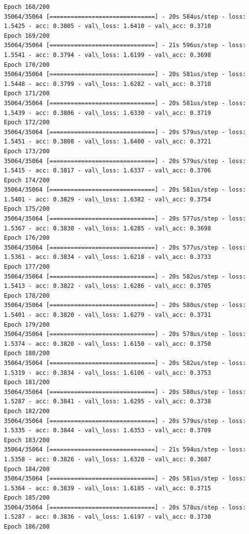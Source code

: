 \documentclass[11pt]{article}
\begin{document}
\begin{Verbatim}[commandchars=\\\{\}]
Epoch 168/200
35064/35064 [==============================] - 20s 584us/step - loss: 1.5425 - acc: 0.3805 - val\_loss: 1.6410 - val\_acc: 0.3710
Epoch 169/200
35064/35064 [==============================] - 21s 596us/step - loss: 1.5541 - acc: 0.3794 - val\_loss: 1.6199 - val\_acc: 0.3698
Epoch 170/200
35064/35064 [==============================] - 20s 581us/step - loss: 1.5448 - acc: 0.3799 - val\_loss: 1.6282 - val\_acc: 0.3710
Epoch 171/200
35064/35064 [==============================] - 20s 581us/step - loss: 1.5439 - acc: 0.3806 - val\_loss: 1.6330 - val\_acc: 0.3719
Epoch 172/200
35064/35064 [==============================] - 20s 579us/step - loss: 1.5451 - acc: 0.3808 - val\_loss: 1.6400 - val\_acc: 0.3721
Epoch 173/200
35064/35064 [==============================] - 20s 579us/step - loss: 1.5415 - acc: 0.3817 - val\_loss: 1.6337 - val\_acc: 0.3706
Epoch 174/200
35064/35064 [==============================] - 20s 581us/step - loss: 1.5401 - acc: 0.3829 - val\_loss: 1.6382 - val\_acc: 0.3754
Epoch 175/200
35064/35064 [==============================] - 20s 577us/step - loss: 1.5367 - acc: 0.3830 - val\_loss: 1.6285 - val\_acc: 0.3698
Epoch 176/200
35064/35064 [==============================] - 20s 577us/step - loss: 1.5361 - acc: 0.3834 - val\_loss: 1.6218 - val\_acc: 0.3733
Epoch 177/200
35064/35064 [==============================] - 20s 582us/step - loss: 1.5413 - acc: 0.3822 - val\_loss: 1.6286 - val\_acc: 0.3705
Epoch 178/200
35064/35064 [==============================] - 20s 580us/step - loss: 1.5401 - acc: 0.3820 - val\_loss: 1.6279 - val\_acc: 0.3731
Epoch 179/200
35064/35064 [==============================] - 20s 578us/step - loss: 1.5374 - acc: 0.3820 - val\_loss: 1.6150 - val\_acc: 0.3750
Epoch 180/200
35064/35064 [==============================] - 20s 582us/step - loss: 1.5319 - acc: 0.3834 - val\_loss: 1.6106 - val\_acc: 0.3753
Epoch 181/200
35064/35064 [==============================] - 20s 580us/step - loss: 1.5287 - acc: 0.3841 - val\_loss: 1.6295 - val\_acc: 0.3738
Epoch 182/200
35064/35064 [==============================] - 20s 579us/step - loss: 1.5335 - acc: 0.3844 - val\_loss: 1.6353 - val\_acc: 0.3709
Epoch 183/200
35064/35064 [==============================] - 21s 594us/step - loss: 1.5358 - acc: 0.3826 - val\_loss: 1.6320 - val\_acc: 0.3687
Epoch 184/200
35064/35064 [==============================] - 20s 581us/step - loss: 1.5364 - acc: 0.3839 - val\_loss: 1.6185 - val\_acc: 0.3715
Epoch 185/200
35064/35064 [==============================] - 20s 578us/step - loss: 1.5287 - acc: 0.3836 - val\_loss: 1.6197 - val\_acc: 0.3730
Epoch 186/200

\end{Verbatim}
\end{document}
